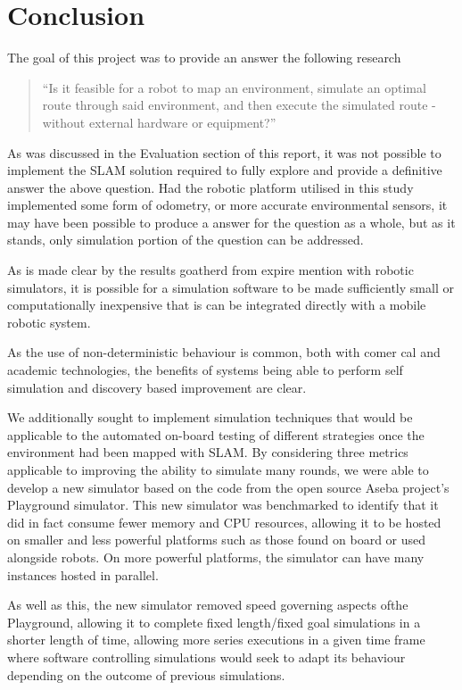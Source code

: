 \section{Conclusion}
The goal of this project was to provide an answer the following research
\begin{quote}
``Is it feasible for a robot to map an environment, simulate an optimal route
through said environment, and then execute the simulated route - without
external hardware or equipment?'' 
\end{quote}
As was discussed in the Evaluation section of this report, it was not possible
to implement the SLAM solution required to fully explore and provide a
definitive answer the above question.
Had the robotic platform utilised in this study implemented some form of
odometry, or more accurate environmental sensors, it may have been possible to
produce a answer for the question as a whole, but as it stands, only
simulation portion of the question can be addressed.


As is made clear by the results goatherd from expire mention with robotic
simulators, it is possible for a simulation software to be made sufficiently
small or computationally inexpensive that is can be integrated directly with a
mobile robotic system.



As the use of non-deterministic behaviour is common, both with comer cal
and academic technologies, the benefits of systems being able to perform self
simulation and discovery based improvement are clear.

We additionally sought to implement simulation techniques that would be
applicable to the automated on-board testing of different strategies once the
environment had been mapped with SLAM. By considering three metrics applicable
to improving the ability to simulate many rounds, we were able to develop a new
simulator based on the code from the open source Aseba project's Playground
simulator. This new simulator was benchmarked to identify that it did in fact
consume fewer memory and CPU resources, allowing it to be hosted on smaller and
less powerful platforms such as those found on board or used alongside robots.
On more powerful platforms, the simulator can have many instances hosted in
parallel.

As well as this, the new simulator removed speed governing aspects ofthe
Playground, allowing it to complete fixed length/fixed goal simulations in a
shorter length of time, allowing more series executions in a given time frame
where software controlling simulations would seek to adapt its behaviour
depending on the outcome of previous simulations.
